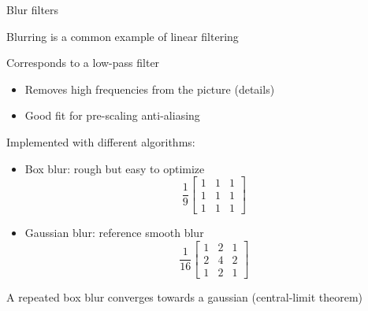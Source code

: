 \begin{frame}{Blur filters}
  \begin{itemize}
  \item Blurring is a common example of linear filtering
  \item Corresponds to a low-pass filter
    \begin{itemize}
    \item Removes high frequencies from the picture (details)
    \item Good fit for pre-scaling anti-aliasing
    \end{itemize}
\begin{minipage}[b]{0.45\textwidth}
  \item Implemented with different algorithms:
    \vspace{-1.5em}
    \begin{itemize}
    \item Box blur: rough but easy to optimize
\[
\frac{1}{9}
\left[
\begin{matrix}
1 & 1 & 1 \\
1 & 1 & 1 \\
1 & 1 & 1
\end{matrix}
\right]
\]
    \end{itemize}
\end{minipage}
\begin{minipage}[b]{0.45\textwidth}
    \begin{itemize}
    \item Gaussian blur: reference smooth blur
\[
\frac{1}{16}
\left[
\begin{matrix}
1 & 2 & 1 \\
2 & 4 & 2 \\
1 & 2 & 1
\end{matrix}
\right]
\]
    \end{itemize}
    \end{minipage}
  \item A repeated box blur converges towards a gaussian (central-limit theorem)
  \end{itemize}
\end{frame}

